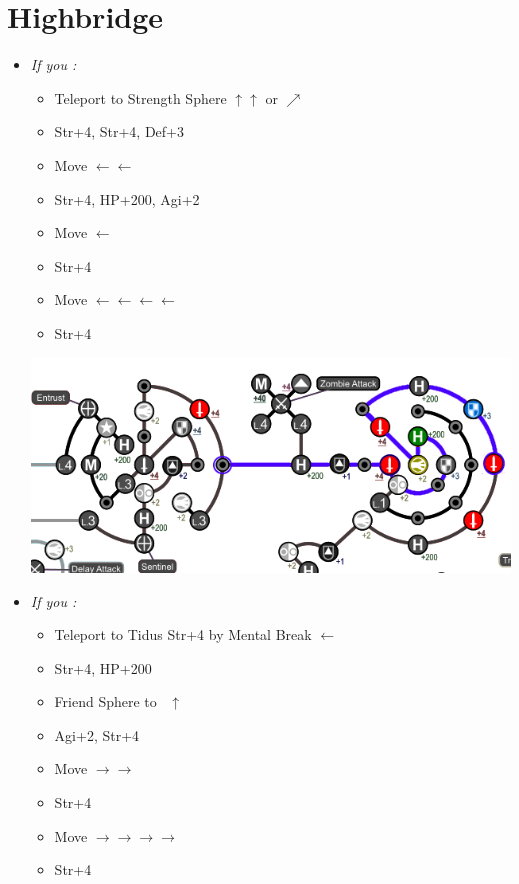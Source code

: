 \chapter{Highbridge}
\begin{spheregrid}
  \begin{itemize}
    \yunaf
    \item \textit{If you \wonblitz:}
          \begin{itemize}
            \item Teleport to Strength Sphere $\uparrow\uparrow$ or $\nearrow$
            \item Str+4, Str+4, Def+3
            \item Move $\leftarrow\leftarrow$
            \item Str+4, HP+200, Agi+2
            \item Move $\leftarrow$
            \item Str+4
            \item Move $\leftarrow\leftarrow\leftarrow\leftarrow$
            \item Str+4
          \end{itemize}
          \includegraphics[width=.9\columnwidth]{graphics/Yuna_blitz_WIN_highroad}
    \item \textit{If you \lostblitz:}
          \begin{itemize}
            \item Teleport to Tidus Str+4 by Mental Break $\leftarrow$
            \item Str+4, HP+200
            \item Friend Sphere to \tidus\ $\uparrow$
            \item Agi+2, Str+4
            \item Move $\rightarrow\rightarrow$
            \item Str+4
            \item Move $\rightarrow\rightarrow\rightarrow\rightarrow$
            \item Str+4

\end{itemize}
\end{itemize}
\end{spheregrid}
